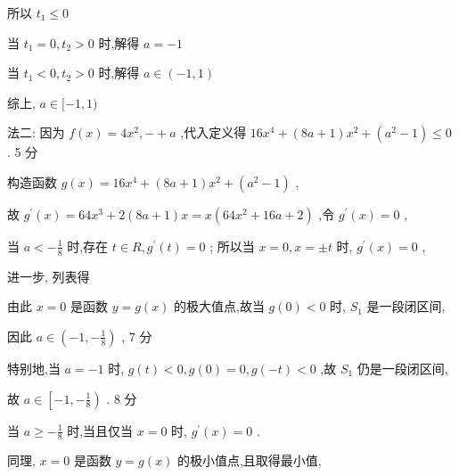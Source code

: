 \documentclass[10pt]{article}
\begin{document}
所以 \({t}_{1} \leq  0\)

当 \({t}_{1} = 0,{t}_{2} > 0\) 时,解得 \(a =  - 1\)

当 \({t}_{1} < 0,{t}_{2} > 0\) 时,解得 \(a \in  \left( {-1,1}\right)\)

综上, \(a \in  \lbrack  - 1,1)\)

法二: 因为 \(f\left( x\right)  = 4{x}^{2}, -  + a\) ,代入定义得 \({16}{x}^{4} + \left( {{8a} + 1}\right) {x}^{2} + \left( {{a}^{2} - 1}\right)  \leq  0\) . 5 分

构造函数 \(g\left( x\right)  = {16}{x}^{4} + \left( {{8a} + 1}\right) {x}^{2} + \left( {{a}^{2} - 1}\right)\) ,

故 \({g}^{\prime }\left( x\right)  = {64}{x}^{3} + 2\left( {{8a} + 1}\right) x = x\left( {{64}{x}^{2} + {16a} + 2}\right)\) ,令 \({g}^{\prime }\left( x\right)  = 0\) ,

当 \(a <  - \frac{1}{8}\) 时,存在 \(t \in  R,{g}^{\prime }\left( t\right)  = 0\) ; 所以当 \(x = 0,x =  \pm  t\) 时, \({g}^{\prime }\left( x\right)  = 0\) ,

进一步, 列表得

\begin{center}
\end{center}

由此 \(x = 0\) 是函数 \(y = g\left( x\right)\) 的极大值点,故当 \(g\left( 0\right)  < 0\) 时, \({S}_{1}\) 是一段闭区间,

因此 \(a \in  \left( {-1, - \frac{1}{8}}\right)\) , 7 分

特别地,当 \(a =  - 1\) 时, \(g\left( t\right)  < 0,g\left( 0\right)  = 0,g\left( {-t}\right)  < 0\) ,故 \({S}_{1}\) 仍是一段闭区间,

故 \(a \in  \left\lbrack  {-1, - \frac{1}{8}}\right)\) . 8 分

当 \(a \geq   - \frac{1}{8}\) 时,当且仅当 \(x = 0\) 时, \({g}^{\prime }\left( x\right)  = 0\) .

同理, \(x = 0\) 是函数 \(y = g\left( x\right)\) 的极小值点,且取得最小值,
\end{document}
